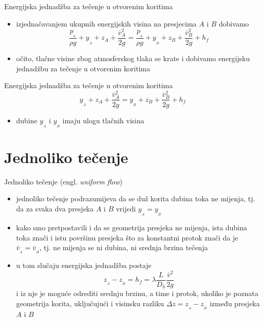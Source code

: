 \documentclass[croatian]{beamer}
\begin{document}
\begin{frame}{Energijska jednadžba za tečenje u otvorenim koritima}

\begin{itemize}
\item izjednačavanjem ukupnih energijskih visina na presjecima $A$ i $B$
dobivamo
\[
\frac{p_{_{a}}}{\rho g}+y_{_{A}}+z_{{\scriptscriptstyle A}}+\frac{\bar{v}_{{\scriptscriptstyle A}}^{2}}{2g}=\frac{p_{_{a}}}{\rho g}+y_{_{B}}+z_{{\scriptscriptstyle B}}+\frac{\bar{v}_{{\scriptscriptstyle B}}^{2}}{2g}+h_{f}
\]
\item očito, tlačne visine zbog atmosferskog tlaka se krate i dobivamo energijsku
jednadžbu za tečenje u otvorenim koritima
\end{itemize}
\begin{alertblock}{Energijska jednadžba za tečenje u otvorenim koritima}
\[
y_{_{A}}+z_{{\scriptscriptstyle A}}+\frac{\bar{v}_{{\scriptscriptstyle A}}^{2}}{2g}=y_{_{B}}+z_{{\scriptscriptstyle B}}+\frac{\bar{v}_{{\scriptscriptstyle B}}^{2}}{2g}+h_{f}
\]
\end{alertblock}
\begin{itemize}
\item dubine $y_{_{A}}$ i $y_{_{B}}$ imaju ulogu tlačnih visina
\end{itemize}
\end{frame}

\section{Jednoliko tečenje}
\begin{frame}{Jednoliko tečenje (engl. \emph{uniform flow})}

\begin{itemize}
\item \alert{jednoliko tečenje} podrazumijeva da se duž korita dubina
toka ne mijenja, tj. da za svaka dva presjeka $A$ i $B$ vrijedi
$y_{_{A}}=y_{_{B}}$
\item kako smo pretpostavili i da se geometrija presjeka ne mijenja, ista
dubina toka znači i istu površinu presjeka što za konstantni protok
znači da je $\bar{v}_{_{A}}=\bar{v}_{_{B}}$, tj. ne mijenja se ni
dubina, ni srednja brzina tečenja
\item u tom slučaju energijska jednadžba postaje
\[
z_{_{A}}-z_{_{B}}=h_{f}=\lambda\frac{L}{D_{h}}\frac{\bar{v}^{2}}{2g}
\]
i iz nje je moguće odrediti srednju brzinu, a time i protok, ukoliko
je poznata geometrija korita, uključujući i visinsku razliku $\Delta z=z_{_{A}}-z_{_{B}}$
između presjeka $A$ i $B$
\end{itemize}
\end{frame}
\end{document}
